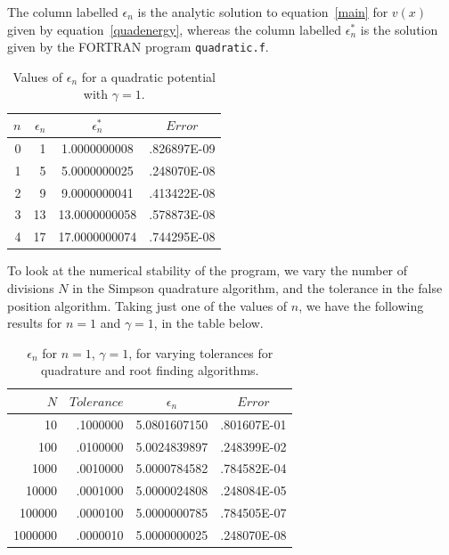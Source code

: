 \documentclass[a4paper]{IEEEtran}
\begin{document}
    The column labelled $\epsilon_n$ is the analytic solution to
    equation~\ref{main} for $v(x)$ given by equation~\ref{quadenergy},
    whereas the column labelled $\epsilon_n^{*}$ is the solution given
    by the FORTRAN program \verb+quadratic.f+.

    \begin{table}[h] 
    \caption{Values of $\epsilon_n$ for a quadratic potential with $\gamma = 1$.}
    \label{tbl:epsilon} 
    \begin{center}
    \begin{tabular}{|r|r|c|c|} \hline
    $n$ & $\epsilon_n$ & $\epsilon_n^{*}$ & $Error$ \\ 
    \hline
    \hline
    0   &   1   &   1.0000000008    &   .826897E-09 \\ 
    1   &   5   &   5.0000000025    &   .248070E-08 \\ 
    2   &   9   &   9.0000000041    &   .413422E-08 \\ 
    3   &  13   &  13.0000000058    &   .578873E-08 \\   
    4   &  17   &  17.0000000074    &   .744295E-08 \\ \hline
    \end{tabular}
    \end{center}
    \end{table} 

    To look at the numerical stability of the program, we vary the
    number of divisions $N$ in the Simpson quadrature algorithm, and the
    tolerance in the false position algorithm. Taking just one of the
    values of $n$, we have the following results for $n = 1$ and
    $\gamma = 1$, in the table below.

    \begin{table}[h]
    \caption{$\epsilon_n$ for $n=1$, $\gamma = 1$,
                    for varying tolerances for quadrature and root
                    finding algorithms.  }
    \label{tbl:epsilon-prime} 
    \begin{center}
    \begin{tabular}{|r|r|c|c|} \hline
    $N$ & $Tolerance$ & $\epsilon_n$ & $Error$  \\
    \hline
    \hline
              10 &.1000000  &5.0801607150   &.801607E-01 \\
             100 &.0100000  &5.0024839897   &.248399E-02 \\
            1000 &.0010000  &5.0000784582   &.784582E-04 \\
           10000 &.0001000  &5.0000024808   &.248084E-05 \\
          100000 &.0000100  &5.0000000785   &.784505E-07 \\
         1000000 &.0000010  &5.0000000025   &.248070E-08 \\ \hline
    \end{tabular}
    \end{center}
    \end{table} 
\end{document}
